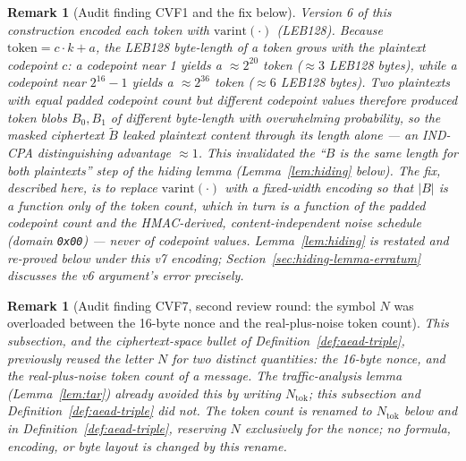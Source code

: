 \documentclass[11pt,a4paper]{article}
\newtheorem{remark}[theorem]{Remark}
\begin{document}
\begin{remark}[Audit finding CVF1 and the fix below]
Version 6 of this construction encoded each token with
$\mathrm{varint}(\cdot)$ (LEB128). Because $\mathrm{token} = c \cdot k + a$,
the LEB128 byte-length of a token grows with the plaintext codepoint $c$: a
codepoint near 1 yields a $\approx 2^{20}$ token ($\approx 3$ LEB128 bytes),
while a codepoint near $2^{16}-1$ yields a $\approx 2^{36}$ token
($\approx 6$ LEB128 bytes). Two plaintexts with equal padded codepoint
count but different codepoint values therefore produced token blobs
$B_0, B_1$ of \emph{different byte-length} with overwhelming probability,
so the masked ciphertext $\widetilde{B}$ leaked plaintext content through
its length alone --- an IND-CPA distinguishing advantage $\approx 1$. This
invalidated the ``$B$ is the same length for both plaintexts'' step of the
hiding lemma (Lemma~\ref{lem:hiding} below). The fix, described here, is to
replace $\mathrm{varint}(\cdot)$ with a fixed-width encoding so that
$\lvert B \rvert$ is a function only of the token \emph{count}, which in
turn is a function of the padded codepoint count and the HMAC-derived,
content-independent noise schedule (domain \texttt{0x00}) --- never of
codepoint values. Lemma~\ref{lem:hiding} is restated and re-proved below
under this v7 encoding; Section~\ref{sec:hiding-lemma-erratum} discusses the
v6 argument's error precisely.
\end{remark}

\begin{remark}[Audit finding CVF7, second review round: the symbol $N$ was overloaded between the 16-byte nonce and the real-plus-noise token count]
\label{rem:v2cvf7}
This subsection, and the ciphertext-space bullet of
Definition~\ref{def:aead-triple}, previously reused the letter $N$ for two
distinct quantities: the 16-byte nonce, and the real-plus-noise token
count of a message. The traffic-analysis lemma (Lemma~\ref{lem:tar})
already avoided this by writing $N_{\mathrm{tok}}$; this subsection and
Definition~\ref{def:aead-triple} did not. The token count is renamed to
$N_{\mathrm{tok}}$ below and in Definition~\ref{def:aead-triple}, reserving
$N$ exclusively for the nonce; no formula, encoding, or byte layout is
changed by this rename.
\end{remark}
\end{document}
